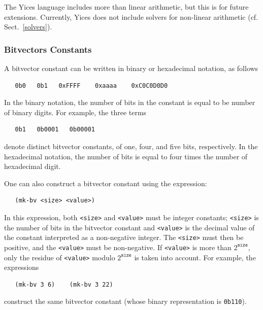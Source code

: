 \documentclass[11pt,twoside,fleqn,openright,titlepage]{cslreport}
\begin{document}
\medskip\noindent
The Yices language includes more than linear arithmetic, but this is
for future extensions. Currently, Yices does not include solvers for
non-linear arithmetic (cf. Sect.~\ref{solvers}).

\subsubsection*{Bitvectors Constants}

A bitvector constant can be written in binary or hexadecimal notation, as follows
\begin{small}
\begin{verbatim}
   0b0   0b1   0xFFFF    0xaaaa    0xC0C0D0D0
\end{verbatim}
\end{small}
In the binary notation, the number of bits in the constant is equal to
be number of binary digits. For example, the three terms
\begin{small}
\begin{verbatim}
   0b1   0b0001   0b00001
\end{verbatim}
\end{small}
denote distinct bitvector constants, of one, four, and five bits, respectively.
In the hexadecimal notation, the number of bits is equal to four times the number
of hexadecimal digit.

\medskip\noindent
One can also construct a bitvector constant using the expression:
\begin{small}
\begin{verbatim}
   (mk-bv <size> <value>)
\end{verbatim}
\end{small}
In this expression, both \texttt{<size>} and \texttt{<value>} must be
integer constants; \texttt{<size>} is the number of bits in the
bitvector constant and \texttt{<value>} is the decimal value of the
constant interpreted as a non-negative integer. The \texttt{<size>}
must then be positive, and the \texttt{<value>} must be
non-negative. If \texttt{<value>} is more than $2^{\mathtt{size}}$,
only the residue of \texttt{<value>} modulo $2^{\mathtt{size}}$ is
taken into account. For example, the expressions
\begin{small}
\begin{verbatim}
   (mk-bv 3 6)    (mk-bv 3 22)
\end{verbatim}
\end{small}
construct the same bitvector constant (whose binary representation is
\texttt{0b110}).
\end{document}
